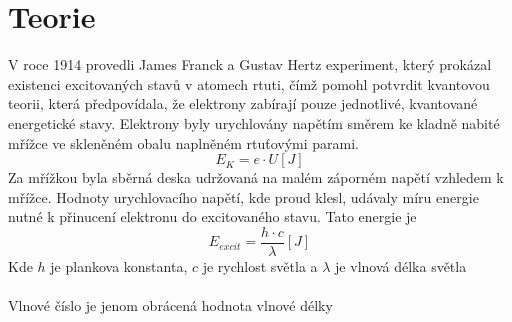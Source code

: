 \documentclass{article}
\begin{document}
\section{Teorie}
V roce 1914 provedli James Franck a Gustav Hertz experiment, který prokázal existenci excitovaných stavů v atomech rtuti, čímž pomohl potvrdit kvantovou teorii, která předpovídala, že elektrony zabírají pouze jednotlivé, kvantované energetické stavy. Elektrony byly urychlovány napětím směrem ke kladně nabité mřížce ve skleněném obalu naplněném rtuťovými parami.\\
\begin{equation}
  E_{K} = e \cdot U [J]
\end{equation}
Za mřížkou byla sběrná deska udržovaná na malém záporném napětí vzhledem k mřížce. Hodnoty urychlovacího napětí, kde proud klesl, udávaly míru energie nutné k přinucení elektronu do excitovaného stavu. Tato energie je
\begin{equation}
  E_{excit} = \frac{h \cdot c}{\lambda} [J]
\end{equation}
Kde $h$ je plankova konstanta, $c$ je rychlost světla a $\lambda$ je vlnová délka světla\\\\
Vlnové číslo je jenom obrácená hodnota vlnové délky
\end{document}
